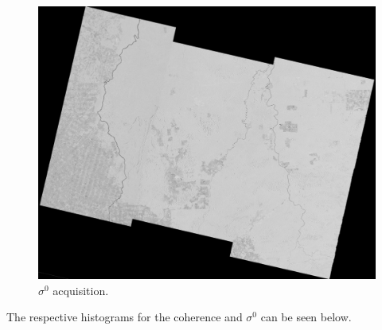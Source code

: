 \begin{figure}[H]
    \centering
    \includegraphics[width=0.75\linewidth]{Chapter5/SENTINEL1/geo_temp_sigma0dbimage.pdf}
    \caption{$\sigma^0$ acquisition.}
    \label{fig:sigma_sentinel}
\end{figure}{}

\newpage
The respective histograms for the coherence and $\sigma^0$ can be seen below.

